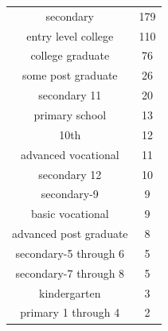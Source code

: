 \begin{table}[!h]
    \vspace{5mm}

    \begin{subtable}[ht]{.5\textwidth}
        \centering
        \begin{tabular}{cc}
            secondary & 179 \\
            entry level college & 110 \\
            college graduate & 76 \\
            some post graduate & 26 \\
            secondary 11 & 20 \\
            primary school & 13 \\
            10th & 12 \\
            advanced vocational & 11 \\
            secondary 12 & 10 \\
            secondary-9 & 9 \\
            basic vocational & 9 \\
            advanced post graduate & 8 \\
            secondary-5 through 6 & 5 \\
            secondary-7 through 8 & 5 \\
            kindergarten & 3 \\
            primary 1 through 4 & 2 \\
        \end{tabular}
    \end{subtable}
\end{table}
